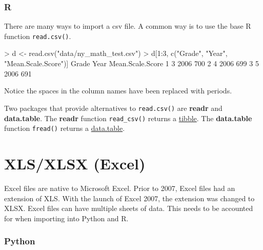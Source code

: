 \documentclass[
]{book}
\newenvironment{Shaded}{\begin{snugshade}}{\end{snugshade}}
\newcommand{\DecValTok}[1]{\textcolor[rgb]{0.00,0.00,0.81}{#1}}
\newcommand{\FunctionTok}[1]{\textcolor[rgb]{0.00,0.00,0.00}{#1}}
\newcommand{\NormalTok}[1]{#1}
\newcommand{\OtherTok}[1]{\textcolor[rgb]{0.56,0.35,0.01}{#1}}
\newcommand{\SpecialCharTok}[1]{\textcolor[rgb]{0.00,0.00,0.00}{#1}}
\newcommand{\StringTok}[1]{\textcolor[rgb]{0.31,0.60,0.02}{#1}}
\begin{document}
\hypertarget{r-10}{%
\subsubsection*{R}\label{r-10}}

There are many ways to import a csv file. A common way is to use the base R function \texttt{read.csv()}.

\begin{Shaded}
\begin{Highlighting}[]
\SpecialCharTok{\textgreater{}}\NormalTok{ d }\OtherTok{\textless{}{-}} \FunctionTok{read.csv}\NormalTok{(}\StringTok{"data/ny\_math\_test.csv"}\NormalTok{)}
\SpecialCharTok{\textgreater{}}\NormalTok{ d[}\DecValTok{1}\SpecialCharTok{:}\DecValTok{3}\NormalTok{, }\FunctionTok{c}\NormalTok{(}\StringTok{"Grade"}\NormalTok{, }\StringTok{"Year"}\NormalTok{, }\StringTok{"Mean.Scale.Score"}\NormalTok{)]}
\NormalTok{  Grade Year Mean.Scale.Score}
\DecValTok{1}     \DecValTok{3} \DecValTok{2006}              \DecValTok{700}
\DecValTok{2}     \DecValTok{4} \DecValTok{2006}              \DecValTok{699}
\DecValTok{3}     \DecValTok{5} \DecValTok{2006}              \DecValTok{691}
\end{Highlighting}
\end{Shaded}

Notice the spaces in the column names have been replaced with periods.

Two packages that provide alternatives to \texttt{read.csv()} are \textbf{readr} and \textbf{data.table}. The \textbf{readr} function \texttt{read\_csv()} returns a \href{https://r4ds.had.co.nz/tibbles.html}{tibble}. The \textbf{data.table} function \texttt{fread()} returns a \href{https://rdatatable.gitlab.io/data.table/articles/datatable-intro.html}{data.table}.

\hypertarget{xlsxlsx-excel}{%
\section{XLS/XLSX (Excel)}\label{xlsxlsx-excel}}

Excel files are native to Microsoft Excel. Prior to 2007, Excel files had an extension of XLS. With the launch of Excel 2007, the extension was changed to XLSX. Excel files can have multiple sheets of data. This needs to be accounted for when importing into Python and R.

\hypertarget{python-11}{%
\subsubsection*{Python}\label{python-11}}
\end{document}
